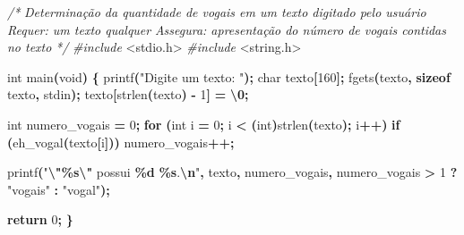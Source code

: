 \documentclass[
  11pt,
  a4paper,
]{scrbook}
\newenvironment{Shaded}{\begin{snugshade}}{\end{snugshade}}
\newcommand{\CharTok}[1]{\textcolor[rgb]{0.31,0.60,0.02}{#1}}
\newcommand{\CommentTok}[1]{\textcolor[rgb]{0.56,0.35,0.01}{\textit{#1}}}
\newcommand{\ControlFlowTok}[1]{\textcolor[rgb]{0.13,0.29,0.53}{\textbf{#1}}}
\newcommand{\DataTypeTok}[1]{\textcolor[rgb]{0.13,0.29,0.53}{#1}}
\newcommand{\DecValTok}[1]{\textcolor[rgb]{0.00,0.00,0.81}{#1}}
\newcommand{\ImportTok}[1]{#1}
\newcommand{\KeywordTok}[1]{\textcolor[rgb]{0.13,0.29,0.53}{\textbf{#1}}}
\newcommand{\NormalTok}[1]{#1}
\newcommand{\OperatorTok}[1]{\textcolor[rgb]{0.81,0.36,0.00}{\textbf{#1}}}
\newcommand{\PreprocessorTok}[1]{\textcolor[rgb]{0.56,0.35,0.01}{\textit{#1}}}
\newcommand{\SpecialCharTok}[1]{\textcolor[rgb]{0.81,0.36,0.00}{\textbf{#1}}}
\newcommand{\StringTok}[1]{\textcolor[rgb]{0.31,0.60,0.02}{#1}}
\begin{document}
\begin{Shaded}
\begin{Highlighting}[]
\CommentTok{/*}
\CommentTok{Determinação da quantidade de vogais em um texto digitado pelo usuário}
\CommentTok{Requer: um texto qualquer}
\CommentTok{Assegura: apresentação do número de vogais contidas no texto}
\CommentTok{*/}
\PreprocessorTok{\#include }\ImportTok{\textless{}stdio.h\textgreater{}}
\PreprocessorTok{\#include }\ImportTok{\textless{}string.h\textgreater{}}

\DataTypeTok{int}\NormalTok{ main}\OperatorTok{(}\DataTypeTok{void}\OperatorTok{)} \OperatorTok{\{}
\NormalTok{    printf}\OperatorTok{(}\StringTok{"Digite um texto: "}\OperatorTok{);}
    \DataTypeTok{char}\NormalTok{ texto}\OperatorTok{[}\DecValTok{160}\OperatorTok{];}
\NormalTok{    fgets}\OperatorTok{(}\NormalTok{texto}\OperatorTok{,} \KeywordTok{sizeof}\NormalTok{ texto}\OperatorTok{,}\NormalTok{ stdin}\OperatorTok{);}
\NormalTok{    texto}\OperatorTok{[}\NormalTok{strlen}\OperatorTok{(}\NormalTok{texto}\OperatorTok{)} \OperatorTok{{-}} \DecValTok{1}\OperatorTok{]} \OperatorTok{=} \CharTok{\textquotesingle{}}\SpecialCharTok{\textbackslash{}0}\CharTok{\textquotesingle{}}\OperatorTok{;}

    \DataTypeTok{int}\NormalTok{ numero\_vogais }\OperatorTok{=} \DecValTok{0}\OperatorTok{;}
    \ControlFlowTok{for} \OperatorTok{(}\DataTypeTok{int}\NormalTok{ i }\OperatorTok{=} \DecValTok{0}\OperatorTok{;}\NormalTok{ i }\OperatorTok{\textless{}} \OperatorTok{(}\DataTypeTok{int}\OperatorTok{)}\NormalTok{strlen}\OperatorTok{(}\NormalTok{texto}\OperatorTok{);}\NormalTok{ i}\OperatorTok{++)}
        \ControlFlowTok{if} \OperatorTok{(}\NormalTok{eh\_vogal}\OperatorTok{(}\NormalTok{texto}\OperatorTok{[}\NormalTok{i}\OperatorTok{]))}
\NormalTok{            numero\_vogais}\OperatorTok{++;}

\NormalTok{    printf}\OperatorTok{(}\StringTok{"}\SpecialCharTok{\textbackslash{}"\%s\textbackslash{}"}\StringTok{ possui }\SpecialCharTok{\%d}\StringTok{ }\SpecialCharTok{\%s}\StringTok{.}\SpecialCharTok{\textbackslash{}n}\StringTok{"}\OperatorTok{,}\NormalTok{ texto}\OperatorTok{,}\NormalTok{ numero\_vogais}\OperatorTok{,}
\NormalTok{           numero\_vogais }\OperatorTok{\textgreater{}} \DecValTok{1} \OperatorTok{?} \StringTok{"vogais"} \OperatorTok{:} \StringTok{"vogal"}\OperatorTok{);}

    \ControlFlowTok{return} \DecValTok{0}\OperatorTok{;}
\OperatorTok{\}}
\end{Highlighting}
\end{Shaded}
\end{document}
